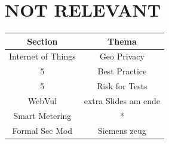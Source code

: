 \documentclass[a4paper, 12pt]{article}
\begin{document}
\section{NOT RELEVANT}
\begin{tabular}{|c|c|} \hline
\textbf{Section} & \textbf{Thema} \\ \hline
Internet of Things & Geo Privacy \\ \hline
5 & Best Practice \\ \hline
5 & Risk for Tests \\ \hline
WebVul & extra Slides am ende \\ \hline
Smart Metering & * \\ \hline
Formal Sec Mod & Siemens zeug \\ \hline



\end{tabular}
\end{document}

